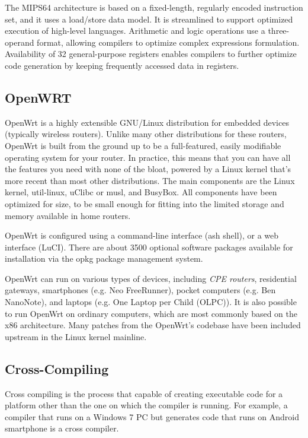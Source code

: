 The MIPS64 architecture is based on a fixed-length, regularly encoded instruction set, and it uses a load/store data model. It is streamlined to support optimized execution of high-level languages. Arithmetic and logic operations use a three-operand format, allowing compilers to optimize complex expressions formulation. Availability of 32 general-purpose registers enables compilers to further optimize code generation by keeping frequently accessed data in registers.
\subsection{OpenWRT}
OpenWrt\cite{fainelli2008openwrt} is a highly extensible GNU/Linux distribution for embedded devices (typically wireless routers). Unlike many other distributions for these routers, OpenWrt is built from the ground up to be a full-featured, easily modifiable operating system for your router. In practice, this means that you can have all the features you need with none of the bloat, powered by a Linux kernel that's more recent than most other distributions. The main components are the Linux kernel, util-linux, uClibc or musl, and BusyBox. All components have been optimized for size, to be small enough for fitting into the limited storage and memory available in home routers.

OpenWrt is configured\cite{petullo2010building} using a command-line interface (ash shell), or a web interface (LuCI). There are about 3500 optional software packages available for installation via the opkg package management system.

OpenWrt can run on various types of devices, including \textit{CPE routers}, residential gateways, smartphones (e.g. Neo FreeRunner), pocket computers (e.g. Ben NanoNote), and laptops (e.g. One Laptop per Child (OLPC)). It is also possible to run OpenWrt on ordinary computers, which are most commonly based on the x86 architecture. Many patches from the OpenWrt's codebase have been included upstream in the Linux kernel mainline.
\subsection{Cross-Compiling}

Cross compiling is the process that capable of creating executable code for a platform other than the one on which the compiler is running. For example, a compiler that runs on a Windows 7 PC but generates code that runs on Android smartphone is a cross compiler.

